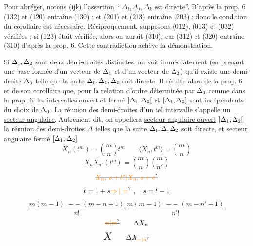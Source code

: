 Pour abréger, notons (ijk) l'assertion `` $\Delta_i,\Delta_j,\Delta_k$ est directe''. D'après la prop. 6 (132) et (120) entraîne (130) ; et (201) et (213) entraîne (203) ; donc le condition du corollaire est nécessaire. Réciproquement, supposons (012), (013) et (032) vérifiées ; si (123) était vérifiée, alors on aurait (310), car (312) et (320) entraîne (310) d'après la prop. 6. Cette contradiction achève la démonstration.

Si $\Delta_{1},\Delta_{2}$ sont deux demi-droites distinctes, on voit immédiatement (en prenant une base formée d'un vecteur de $\Delta_{1}$ et d'un vecteur de $\Delta_{2}$) qu'il existe une demi-droite $\Delta_{0}$ telle que la suite $\Delta_{0},\Delta_{1},\Delta_{2}$ soit directe. Il résulte alors de la prop. 6 et de son corollaire que, pour la relation d'ordre déterminée par $\Delta_{0}$ comme dans la prop. 6, les intervalles ouvert et fermé $]\Delta_{1},\Delta_{2}[$ et $[\Delta_{1},\Delta_{2}]$ sont indépendants du choix de $\Delta_{0}$. La réunion des demi-droites d'un tel intervalle s'appelle un \uline{secteur angulaire}. Autrement dit, on appellera \uline{secteur angulaire ouvert} $]\Delta_{1},\Delta_{2}[$ la réunion des demi-droites $\Delta$ telles que la suite $\Delta_{1},\Delta,\Delta_{2}$ soit directe, et \uline{secteur angulaire fermé} $[\Delta_{1},\Delta_{2}]$
\[
X_n(t^m)=\binom mn t^m\qquad\langle X_n,t^m\rangle=\binom mn
\]
\[X_nX_{n'}(t^m)=\binom mn\binom m{n'}\]
\[\deleted{\unsure{X_n,\,s+t^c|X_n,\,s+c}}\]
\[t=1+s\unsure{\Rightarrow|=}\ ,\quad s=t-1\]
\[
\frac{m(m-1)\;--\;(m-n+1)}{n!}\ \frac{m(m-1)\;--\;(m-n'+1)}{n'!}
\]
\[\deleted{\unsure{n|m}}\qquad\Delta X_n\]
\[\mbox{\Large$X$}\qquad\Delta X_{\unsure{-|n}}\]
